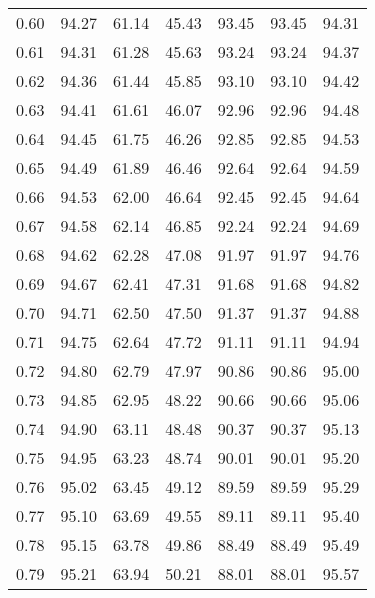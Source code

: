 \begin{tabular}{|c|c|c|c|c|c|c|}
      0.60 &     94.27 &     61.14 &      45.43 &   93.45 &      93.45 &         94.31 \\
      0.61 &     94.31 &     61.28 &      45.63 &   93.24 &      93.24 &         94.37 \\
      0.62 &     94.36 &     61.44 &      45.85 &   93.10 &      93.10 &         94.42 \\
      0.63 &     94.41 &     61.61 &      46.07 &   92.96 &      92.96 &         94.48 \\
      0.64 &     94.45 &     61.75 &      46.26 &   92.85 &      92.85 &         94.53 \\
      0.65 &     94.49 &     61.89 &      46.46 &   92.64 &      92.64 &         94.59 \\
      0.66 &     94.53 &     62.00 &      46.64 &   92.45 &      92.45 &         94.64 \\
      0.67 &     94.58 &     62.14 &      46.85 &   92.24 &      92.24 &         94.69 \\
      0.68 &     94.62 &     62.28 &      47.08 &   91.97 &      91.97 &         94.76 \\
      0.69 &     94.67 &     62.41 &      47.31 &   91.68 &      91.68 &         94.82 \\
      0.70 &     94.71 &     62.50 &      47.50 &   91.37 &      91.37 &         94.88 \\
      0.71 &     94.75 &     62.64 &      47.72 &   91.11 &      91.11 &         94.94 \\
      0.72 &     94.80 &     62.79 &      47.97 &   90.86 &      90.86 &         95.00 \\
      0.73 &     94.85 &     62.95 &      48.22 &   90.66 &      90.66 &         95.06 \\
      0.74 &     94.90 &     63.11 &      48.48 &   90.37 &      90.37 &         95.13 \\
      0.75 &     94.95 &     63.23 &      48.74 &   90.01 &      90.01 &         95.20 \\
      0.76 &     95.02 &     63.45 &      49.12 &   89.59 &      89.59 &         95.29 \\
      0.77 &     95.10 &     63.69 &      49.55 &   89.11 &      89.11 &         95.40 \\
      0.78 &     95.15 &     63.78 &      49.86 &   88.49 &      88.49 &         95.49 \\
      0.79 &     95.21 &     63.94 &      50.21 &   88.01 &      88.01 &         95.57 \\

\end{tabular}
